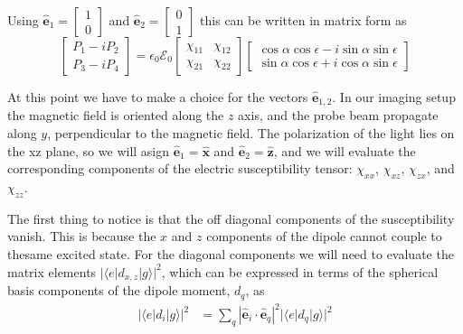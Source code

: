 \documentclass[11pt,letter]{article}
\newcommand{\bv}[1]{\ensuremath{\bm{#1}}}
\newcommand{\efieldo}{\ensuremath{\mathcal{E}_{0}}}
\begin{document}
Using  
$\bv{\hat{e}}_{1} = \left[ \begin{smallmatrix}  1 \\ 0 \end{smallmatrix} \right]$
and 
$\bv{\hat{e}}_{2} = \left[ \begin{smallmatrix}  0 \\ 1 \end{smallmatrix} \right]$
this can be written in matrix form as 
\begin{equation}
 \left[ \begin{matrix}  P_{1}-iP_{2} \\ P_{3}-iP_{4} \end{matrix} \right]
  =  \epsilon_{0}\efieldo 
 \left[ \begin{matrix}
     \chi_{11} & \chi_{12} \\ \chi_{21} & \chi_{22} 
 \end{matrix} \right]
 \left[ \begin{matrix}
      \cos\alpha \cos \epsilon - i \sin\alpha\sin\epsilon \\
      \sin\alpha \cos\epsilon + i \cos\alpha\sin\epsilon
 \end{matrix} \right]
\end{equation}

At this point we have to make a choice for the vectors $\bv{\hat{e}}_{1,2}$.
In our imaging setup the magnetic field is oriented along the $z$ axis, and the
probe beam propagate along $y$, perpendicular to the magnetic field.   The
polarization of the light lies on the xz plane, so we will asign
$\bv{\hat{e}}_{1} = \bv{\hat{x}}$ and $\bv{\hat{e}}_{2} = \bv{\hat{z}}$, and we
will evaluate the corresponding components of the electric susceptibility
tensor: $\chi_{xx}$, $\chi_{xz}$, $\chi_{zx}$, and $\chi_{zz}$.

The first thing to notice is that the off diagonal components of the
susceptibility vanish.  This is because the $x$ and $z$ components of the
dipole cannot couple to thesame excited state.   For the diagonal components we
will need to evaluate the matrix elements $ | \langle e | d_{x,z} | g \rangle
|^{2} $,  which can be expressed in terms of the spherical basis components of
the dipole moment, $d_{q}$, as 
\begin{align}
|\langle e | d_{i} | g \rangle|^{2} & =  \sum_{q} |\bv{\hat{e}}_{i}\cdot \bv{\hat{e}}_{q}|^{2} 
 | \langle e | d_{q} | g \rangle | ^{2} 
\end{align}
\end{document}
